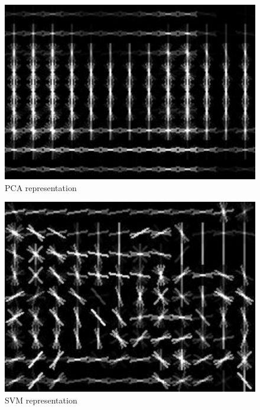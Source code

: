 \begin{figure}
\centering
\includegraphics[width=0.7\linewidth]{images/whitened_hog_pca}
\caption[PCA representation]{PCA representation}
\label{fig:whitened_hog_pca}
\end{figure}
\begin{figure}
\centering
\includegraphics[width=0.7\linewidth]{images/whitened_hog_svm}
\caption[SVM representation]{SVM representation}
\label{fig:whitened_hog_svm}
\end{figure}
